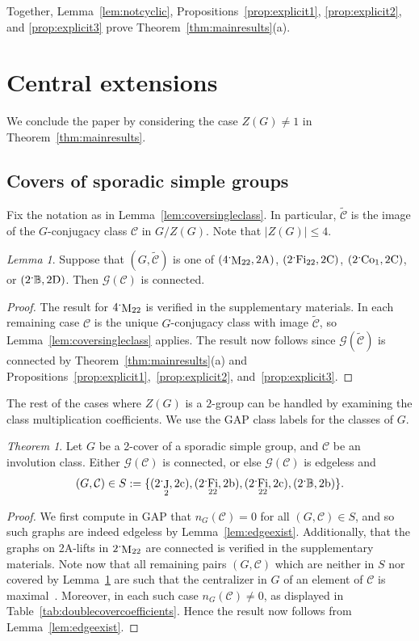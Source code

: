 \documentclass[11pt,a4paper]{amsart}
\theoremstyle{plain}
\theoremstyle{definition}
\theoremstyle{remark}
\newtheorem{lemma}[definition]{Lemma}
\newtheorem{theorem}[definition]{Theorem}
\theoremstyle{remark}
\theoremstyle{remark}
\theoremstyle{definition}
\newcommand{\ns}{\mathbin{\mspace{-4mu}\vcenter{\hbox{\raisebox{1ex}{$\cdot$}}}\mspace{-4mu}}}
\newcommand{\GG}{\mathcal{G}}
\newcommand{\BM}{\mathbb{B}}
\DeclareMathOperator{\M}{M}
\DeclareMathOperator{\J}{J}
\DeclareMathOperator{\Co}{Co}
\DeclareMathOperator{\Fi}{Fi}
\begin{document}
\medskip
Together, Lemma~\ref{lem:notcyclic}, Propositions~\ref{prop:explicit1}, \ref{prop:explicit2}, and \ref{prop:explicit3} prove Theorem~\ref{thm:mainresults}(a).

\section {Central extensions}\label{s:covers}
We conclude the paper by considering the case $Z(G)\ne 1$ in Theorem~\ref{thm:mainresults}.

\subsection{Covers of sporadic simple groups}

Fix the notation as in Lemma~\ref{lem:coversingleclass}. In particular, $\widetilde{\mathcal{C}}$ is the image of the $G$-conjugacy class $\mathcal{C}$ in $G/Z(G)$. Note that $|Z(G)|\le 4$.


\begin{lemma}\label{cor:coverconn}
Suppose that $(G,\widetilde{\mathcal{C}})$ is one of $(4\ns\M_{22},\mathrm{2A})$, $(2\ns\Fi_{22},\mathrm{2C})$, $(2\ns\Co_1,\mathrm{2C})$, or $(2\ns\BM,\mathrm{2D})$. Then $\GG(\mathcal{C})$ is connected.
\end{lemma}
\begin{proof}
The result for $4\ns\M_{22}$ is verified in the supplementary materials. In each remaining case $\mathcal{C}$ is the unique $G$-conjugacy class with image $\widetilde{\mathcal{C}}$, so Lemma~\ref{lem:coversingleclass} applies. The result now follows since $\GG(\widetilde{\mathcal{C}})$ is connected by Theorem~\ref{thm:mainresults}(a) and Propositions~\ref{prop:explicit1},~\ref{prop:explicit2}, and~\ref{prop:explicit3}.
\end{proof}
The rest of the cases where $Z(G)$ is a $2$-group can be handled by examining the class multiplication coefficients. We use the {\sf GAP} class labels for the classes of $G$.
\begin{theorem}
Let $G$ be a 2-cover of a sporadic simple group, and $\mathcal{C}$ be an involution class. Either $\GG(\mathcal{C})$ is connected, or else $\GG(\mathcal{C})$ is edgeless and \[(G,\mathcal{C})\in S:=\{(2\ns\J_2,\mathrm{2c}),(2\ns\Fi_{22},\mathrm{2b}),(2\ns\Fi_{22},\mathrm{2c}),(2\ns\BM,\mathrm{2b})\}.\]
\end{theorem}
\begin{proof}
We first compute in {\sf GAP} that $n_G(\mathcal{C})=0$ for all $(G,\mathcal{C})\in S$, and so such graphs are indeed edgeless by Lemma~\ref{lem:edgeexist}. Additionally, that the graphs on 2A-lifts in $2\ns\M_{22}$ are connected is verified in the supplementary materials. Note now that all remaining pairs $(G,\mathcal{C})$ which are neither in $S$ nor covered by Lemma~\ref{cor:coverconn} are such that the centralizer in $G$ of an element of $\mathcal{C}$ is maximal~\cite{atlas}. Moreover, in each such case $n_G(\mathcal{C})\ne0$, as displayed in Table~\ref{tab:doublecovercoefficients}. Hence the result now follows from Lemma~\ref{lem:edgeexist}.
\end{proof}
\end{document}
